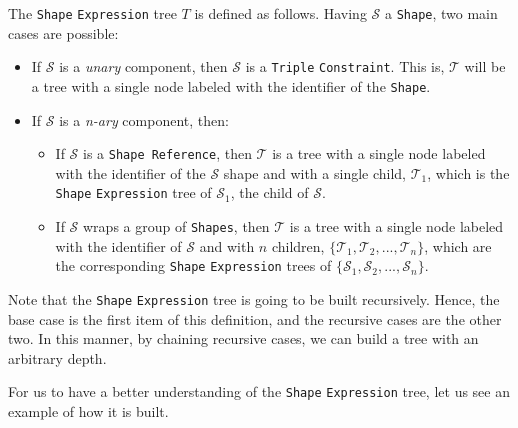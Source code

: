 \begin{definition}
    The \texttt{Shape} \texttt{Expression} tree $T$ is defined as follows. Having $\mathcal{S}$ a \texttt{Shape}, two main cases are possible:

    \begin{itemize}
        \itemsep0.5em
        \item If $\mathcal{S}$ is a \textit{unary} component, then $\mathcal{S}$ is a \texttt{Triple} \texttt{Constraint}. This is, $\mathcal{T}$ will be a tree with a single node labeled with the identifier of the \texttt{Shape}.
        \item If $\mathcal{S}$ is a \textit{n-ary} component, then:
              \begin{itemize}
                  \itemsep0.25em
                  \item If $\mathcal{S}$ is a \texttt{Shape Reference}, then $\mathcal{T}$ is a tree with a single node labeled with the identifier of the $\mathcal{S}$ shape and with a single child, $\mathcal{T}_1$, which is the \texttt{Shape} \texttt{Expression} tree of $\mathcal{S}_1$, the child of $\mathcal{S}$.
                  \item If $\mathcal{S}$ wraps a group of \texttt{Shapes}, then $\mathcal{T}$ is a tree with a single node labeled with the identifier of $\mathcal{S}$ and with $n$ children, $\{\mathcal{T}_1, \mathcal{T}_2, ..., \mathcal{T}_n\}$, which are the corresponding \texttt{Shape} \texttt{Expression} trees of $\{\mathcal{S}_1, \mathcal{S}_2, ..., \mathcal{S}_n\}$.
              \end{itemize}
    \end{itemize}

    Note that the \texttt{Shape} \texttt{Expression} tree is going to be built recursively. Hence, the base case is the first item of this definition, and the recursive cases are the other two. In this manner, by chaining recursive cases, we can build a tree with an arbitrary depth.
\end{definition}

For us to have a better understanding of the \texttt{Shape} \texttt{Expression} tree, let us see an example of how it is built.

